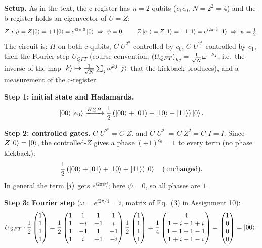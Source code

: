 \documentclass[a4paper, 10pt]{article}
\begin{document}
\begin{solution}
	\noindent \textbf{Setup.} As in the text, the c-register has \( n = 2 \) qubits (\( c_1c_0 \), \( N = 2^2 = 4 \)) and the b-register holds an eigenvector of \( U = Z \):
	\[
		Z\ket{e_0} = Z\ket{0} = +1\ket{0} = e^{i2\pi \cdot 0}\ket{0} \ \Rightarrow\ \psi = 0, \qquad
		Z\ket{e_1} = Z\ket{1} = -1\ket{1} = e^{i2\pi \cdot \frac{1}{2}}\ket{1} \ \Rightarrow\ \psi = \tfrac{1}{2}.
	\]
	The circuit is: \( H \) on both c-qubits, \( C\text{-}U^{2^0} \) controlled by \( c_0 \), \( C\text{-}U^{2^1} \) controlled by \( c_1 \), then the Fourier step \( U_{QFT} \) (course convention, \( \left(U_{QFT}\right)_{kj} = \frac{1}{\sqrt{N}}\omega^{-kj} \), i.e.\ the inverse of the map \( \ket{k} \mapsto \frac{1}{\sqrt{N}}\sum_j\omega^{kj}\ket{j} \) that the kickback produces), and a measurement of the c-register.

	\myspace

	\noindent \textbf{Step 1: initial state and Hadamards.}
	\[
		\ket{00}\ket{e_0} \xrightarrow{H \otimes H} \frac{1}{2}\left(\ket{00} + \ket{01} + \ket{10} + \ket{11}\right)\ket{0}.
	\]

	\noindent \textbf{Step 2: controlled gates.} \( C\text{-}U^{2^0} = C\text{-}Z \), and \( C\text{-}U^{2^1} = C\text{-}Z^2 = C\text{-}I = I \). Since \( Z\ket{0} = \ket{0} \), the controlled-\( Z \) gives a phase \( (+1)^{c_0} = 1 \) to every term (no phase kickback):
	\[
		\frac{1}{2}\left(\ket{00} + \ket{01} + \ket{10} + \ket{11}\right)\ket{0} \quad \text{(unchanged)}.
	\]
	In general the term \( \ket{j} \) gets \( e^{i2\pi\psi j} \); here \( \psi = 0 \), so all phases are \( 1 \).

	\myspace

	\noindent \textbf{Step 3: Fourier step} (\( \omega = e^{i2\pi/4} = i \), matrix of Eq.~(3) in Assignment 10):
	\[
		U_{QFT}\cdot\frac{1}{2}\begin{pmatrix} 1 \\ 1 \\ 1 \\ 1 \end{pmatrix} = \frac{1}{2}\begin{pmatrix}
			1 & 1  & 1  & 1  \\
			1 & -i & -1 & i  \\
			1 & -1 & 1  & -1 \\
			1 & i  & -1 & -i
		\end{pmatrix}\frac{1}{2}\begin{pmatrix} 1 \\ 1 \\ 1 \\ 1 \end{pmatrix} = \frac{1}{4}\begin{pmatrix} 4 \\ 1 - i - 1 + i \\ 1 - 1 + 1 - 1 \\ 1 + i - 1 - i \end{pmatrix} = \begin{pmatrix} 1 \\ 0 \\ 0 \\ 0 \end{pmatrix} = \ket{00}.
	\]


\end{solution}
\end{document}
